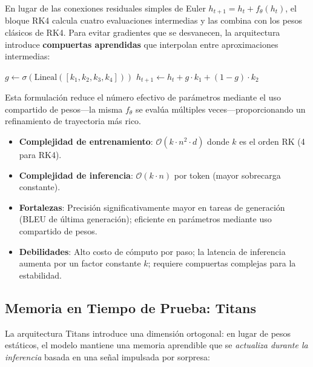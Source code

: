 En lugar de las conexiones residuales simples de Euler $h_{t+1} = h_t + f_\theta(h_t)$, el bloque RK4 calcula cuatro evaluaciones intermedias y las combina con los pesos clásicos de RK4. Para evitar gradientes que se desvanecen, la arquitectura introduce \textbf{compuertas aprendidas} que interpolan entre aproximaciones intermedias:

\begin{algorithmic}[1]
\State $g \gets \sigma(\text{Lineal}([k_1, k_2, k_3, k_4]))$ 
\State $h_{t+1} \gets h_t + g \cdot k_1 + (1-g) \cdot k_2$ 
\end{algorithmic}

Esta formulación reduce el número efectivo de parámetros mediante el uso compartido de pesos---la misma $f_\theta$ se evalúa múltiples veces---proporcionando un refinamiento de trayectoria más rico.

\begin{itemize}[leftmargin=*]
    \item \textbf{Complejidad de entrenamiento}: $\mathcal{O}(k \cdot n^2 \cdot d)$ donde $k$ es el orden RK (4 para RK4).
    \item \textbf{Complejidad de inferencia}: $\mathcal{O}(k \cdot n)$ por token (mayor sobrecarga constante).
    \item \textbf{Fortalezas}: Precisión significativamente mayor en tareas de generación (BLEU de última generación); eficiente en parámetros mediante uso compartido de pesos.
    \item \textbf{Debilidades}: Alto costo de cómputo por paso; la latencia de inferencia aumenta por un factor constante $k$; requiere compuertas complejas para la estabilidad.
\end{itemize}

\subsection{Memoria en Tiempo de Prueba: Titans}

La arquitectura Titans \citep{behrouz_titans_2025} introduce una dimensión ortogonal: en lugar de pesos estáticos, el modelo mantiene una memoria aprendible que se \textit{actualiza durante la inferencia} basada en una señal impulsada por sorpresa:

